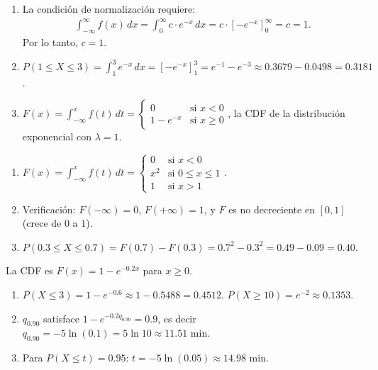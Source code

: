 \begin{solproblema}[prob:14b3125]
	\begin{enumerate}
		\item La condición de normalización requiere:
		\begin{align*}
			\int_{-\infty}^{\infty} f(x)\,dx = \int_{0}^{\infty} c \cdot e^{-x}\,dx = c \cdot [-e^{-x}]_{0}^{\infty} = c = 1.
		\end{align*}
		Por lo tanto, $c = 1$.
		\item $P(1 \le X \le 3) = \int_{1}^{3} e^{-x}\,dx = [-e^{-x}]_{1}^{3} = e^{-1} - e^{-3} \approx 0.3679 - 0.0498 = 0.3181$.
		\item $F(x) = \int_{-\infty}^{x} f(t)\,dt = \begin{cases} 0 & \text{si } x < 0 \\ 1 - e^{-x} & \text{si } x \ge 0 \end{cases}$, la CDF de la distribución exponencial con $\lambda=1$.
	\end{enumerate}
\end{solproblema}

\begin{solproblema}[prob:287c45c]
	\begin{enumerate}
		\item $F(x) = \int_{-\infty}^{x} f(t)\,dt = \begin{cases} 0 & \text{si } x < 0 \\ x^{2} & \text{si } 0 \le x \le 1 \\ 1 & \text{si } x > 1 \end{cases}$.
		\item Verificación: $F(-\infty)=0$, $F(+\infty)=1$, y $F$ es no decreciente en $[0,1]$ (crece de $0$ a $1$).
		\item $P(0.3 \le X \le 0.7) = F(0.7)-F(0.3) = 0.7^2-0.3^2 = 0.49-0.09=0.40$.
	\end{enumerate}
\end{solproblema}

\begin{solproblema}[prob:61a9dd8]
	La CDF es $F(x) = 1 - e^{-0.2x}$ para $x \ge 0$.
	\begin{enumerate}
		\item $P(X \le 3) = 1-e^{-0.6}\approx1-0.5488=0.4512$. $P(X\ge10)=e^{-2}\approx0.1353$.
		\item $q_{0.90}$ satisface $1-e^{-0.2q_{0.90}}=0.9$, es decir $q_{0.90}=-5\ln(0.1)=5\ln10\approx11.51$ min.
		\item Para $P(X\le t)=0.95$: $t=-5\ln(0.05)\approx14.98$ min.
	\end{enumerate}
\end{solproblema}

